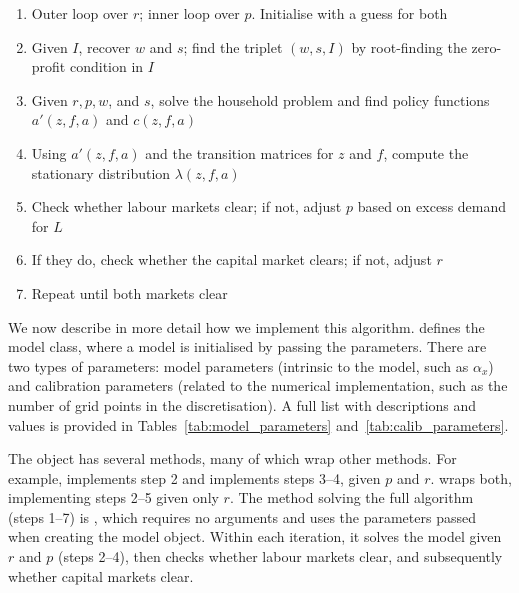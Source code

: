 \documentclass{article}
\begin{document}
\begin{enumerate}
    \vspace{-0.2cm}
    \item Outer loop over $r$; inner loop over $p$. Initialise with a guess for both
    \vspace{-0.2cm}
    \item Given $I$, recover $w$ and $s$; find the triplet $(w,s,I)$ by root-finding the zero-profit condition in $I$
    \vspace{-0.2cm}
    \item Given $r,p,w$, and $s$, solve the household problem and find policy functions $a'(z,f,a)$ and $c(z,f,a)$
    \vspace{-0.2cm}
    \item Using $a'(z,f,a)$ and the transition matrices for $z$ and $f$, compute the stationary distribution $\lambda(z,f,a)$
    \vspace{-0.2cm}
    \item Check whether labour markets clear; if not, adjust $p$ based on excess demand for $L$
    \vspace{-0.2cm}
    \item If they do, check whether the capital market clears; if not, adjust $r$
    \vspace{-0.2cm}
    \item Repeat until both markets clear
    \vspace{-0.2cm}
\end{enumerate}

We now describe in more detail how we implement this algorithm.  defines the model class, where a model is initialised by passing the parameters. There are two types of parameters: model parameters (intrinsic to the model, such as $\alpha_x$) and calibration parameters (related to the numerical implementation, such as the number of grid points in the discretisation). A full list with descriptions and values is provided in Tables~\ref{tab:model_parameters} and~\ref{tab:calib_parameters}.

The  object has several methods, many of which wrap other methods. For example,  implements step 2 and  implements steps 3--4, given $p$ and $r$.  wraps both, implementing steps 2--5 given only $r$. The method solving the full algorithm (steps 1--7) is , which requires no arguments and uses the parameters passed when creating the model object. Within each iteration, it solves the model given $r$ and $p$ (steps 2--4), then checks whether labour markets clear, and subsequently whether capital markets clear.
\end{document}
